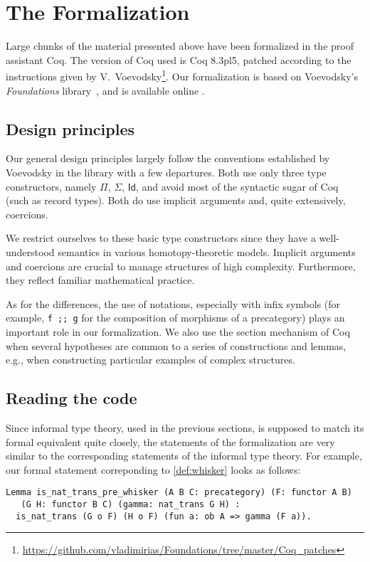 
\section{The Formalization}
\label{sec:formalization}

Large chunks of the material presented above have been formalized in the proof assistant \textsf{Coq}.
The version of \textsf{Coq} used is \textsf{Coq} 8.3pl5, patched according to the instructions given by
V.\ Voevodsky\footnote{\url{https://github.com/vladimirias/Foundations/tree/master/Coq_patches}}.
Our formalization is based on Voevodsky's \emph{Foundations} library~\cite{vv_foundations},
and is available online \cite{rezk_coq}.


\subsection*{Design principles}
Our general design principles largely follow the conventions established by Voevodsky in the library \cite{vv_foundations} 
with a few departures. 
Both use only three type constructors, namely $\Pi$, $\Sigma$, $\textsf{Id}$, and avoid most of the syntactic sugar of \textsf{Coq} (such as record types).
Both do use implicit arguments and, quite extensively, coercions.

We restrict ourselves to these basic type constructors since they have a well-understood
semantics in various homotopy-theoretic models. Implicit arguments and coercions are 
crucial to manage structures of high complexity. Furthermore, they reflect
 familiar mathematical practice.


As for the differences, the use of notations, especially with infix symbols (for example, \lstinline!f ;; g! for 
the composition of morphisms of a precategory) plays an important role in our formalization. 
We also use the section mechanism of \textsf{Coq} 
when several hypotheses are common to a series of constructions and lemmas, e.g., 
when constructing particular examples of complex structures.

\subsection*{Reading the code}

Since informal type theory, used in the previous sections, is supposed to match its formal equivalent quite closely, 
the statements of the formalization are very similar to the corresponding statements of the informal type theory. 
For example, our formal statement correponding to \autoref{def:whisker} looks as follows:
\begin{lstlisting}
Lemma is_nat_trans_pre_whisker (A B C: precategory) (F: functor A B)
   (G H: functor B C) (gamma: nat_trans G H) :
  is_nat_trans (G o F) (H o F) (fun a: ob A => gamma (F a)).
\end{lstlisting}



